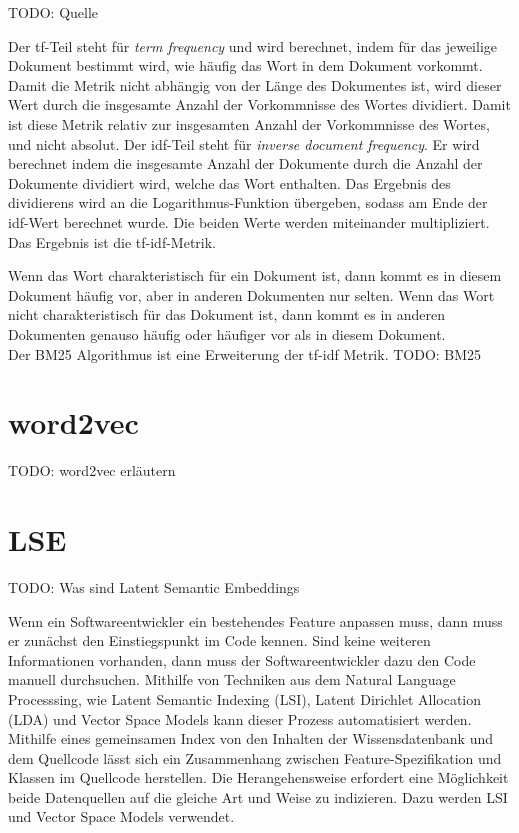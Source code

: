 TODO: Quelle

Der tf-Teil steht für \textit{term frequency} und wird berechnet, indem für das jeweilige Dokument bestimmt wird, wie häufig das Wort in dem Dokument vorkommt.
Damit die Metrik nicht abhängig von der Länge des Dokumentes ist, wird dieser Wert durch die insgesamte Anzahl der Vorkommnisse des Wortes dividiert.
Damit ist diese Metrik relativ zur insgesamten Anzahl der Vorkommnisse des Wortes, und nicht absolut.
Der idf-Teil steht für \textit{inverse document frequency}.
Er wird berechnet indem die insgesamte Anzahl der Dokumente durch die Anzahl der Dokumente dividiert wird, welche das Wort enthalten.
Das Ergebnis des dividierens wird an die Logarithmus-Funktion übergeben, sodass am Ende der idf-Wert berechnet wurde.
Die beiden Werte werden miteinander multipliziert.
Das Ergebnis ist die tf-idf-Metrik.

Wenn das Wort charakteristisch für ein Dokument ist, dann kommt es in diesem Dokument häufig vor, aber in anderen Dokumenten nur selten.
Wenn das Wort nicht charakteristisch für das Dokument ist, dann kommt es in anderen Dokumenten genauso häufig oder häufiger vor als in diesem Dokument.\\

Der BM25 Algorithmus ist eine Erweiterung der tf-idf Metrik.
TODO: BM25


\section{word2vec}
TODO: word2vec erläutern

\section{LSE}
TODO: Was sind Latent Semantic Embeddings

Wenn ein Softwareentwickler ein bestehendes Feature anpassen muss, dann muss er zunächst den Einstiegspunkt im Code kennen.
Sind keine weiteren Informationen vorhanden, dann muss der Softwareentwickler dazu den Code manuell durchsuchen.
Mithilfe von Techniken aus dem Natural Language Processsing, wie Latent Semantic Indexing (LSI), Latent Dirichlet Allocation (LDA) und Vector Space Models kann dieser Prozess automatisiert werden.\cite{Dit_Revelle_Gethers_Poshyvanyk_2011}
Mithilfe eines gemeinsamen Index von den Inhalten der Wissensdatenbank und dem Quellcode lässt sich ein Zusammenhang zwischen Feature-Spezifikation und Klassen im Quellcode herstellen.
Die Herangehensweise erfordert eine Möglichkeit beide Datenquellen auf die gleiche Art und Weise zu indizieren.
Dazu werden LSI und Vector Space Models verwendet.\cite{Antoniol_Canfora_Casazza_DeLucia_2000}

